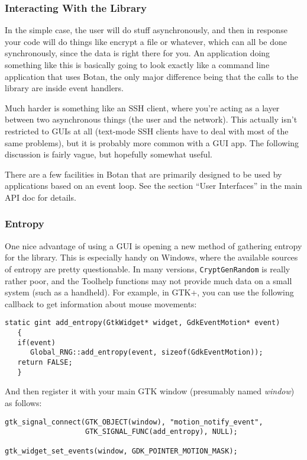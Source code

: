 \documentclass{article}
\newcommand{\variable}[1]{\textsl{#1}}
\begin{document}
\subsubsection{Interacting With the Library}

In the simple case, the user will do stuff asynchronously, and then in response
your code will do things like encrypt a file or whatever, which can all be done
synchronously, since the data is right there for you. An application doing
something like this is basically going to look exactly like a command line
application that uses Botan, the only major difference being that the calls to
the library are inside event handlers.

Much harder is something like an SSH client, where you're acting as a layer
between two asynchronous things (the user and the network). This actually isn't
restricted to GUIs at all (text-mode SSH clients have to deal with most of the
same problems), but it is probably more common with a GUI app. The following
discussion is fairly vague, but hopefully somewhat useful.

There are a few facilities in Botan that are primarily designed to be used by
applications based on an event loop. See the section ``User Interfaces'' in the
main API doc for details.

\subsubsection{Entropy}

One nice advantage of using a GUI is opening a new method of gathering entropy
for the library. This is especially handy on Windows, where the available
sources of entropy are pretty questionable. In many versions,
\texttt{CryptGenRandom} is really rather poor, and the Toolhelp functions may
not provide much data on a small system (such as a handheld). For example, in
GTK+, you can use the following callback to get information about mouse
movements:

\begin{verbatim}
static gint add_entropy(GtkWidget* widget, GdkEventMotion* event)
   {
   if(event)
      Global_RNG::add_entropy(event, sizeof(GdkEventMotion));
   return FALSE;
   }
\end{verbatim}

And then register it with your main GTK window (presumably named
\variable{window}) as follows:

\begin{verbatim}
gtk_signal_connect(GTK_OBJECT(window), "motion_notify_event",
                   GTK_SIGNAL_FUNC(add_entropy), NULL);

gtk_widget_set_events(window, GDK_POINTER_MOTION_MASK);
\end{verbatim}
\end{document}
